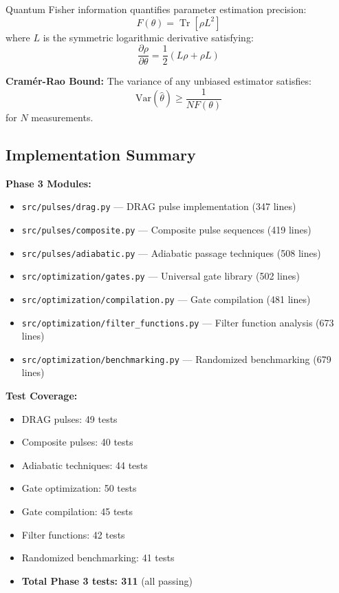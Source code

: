 \documentclass[11pt,a4paper]{article}
\theoremstyle{definition}
\theoremstyle{remark}
\renewcommand{\Tr}{\operatorname{Tr}}
\begin{document}
Quantum Fisher information quantifies parameter estimation precision:
\begin{equation}
F(\theta) = \Tr[\rho L^2]
\end{equation}
where $L$ is the symmetric logarithmic derivative satisfying:
\begin{equation}
\frac{\partial\rho}{\partial\theta} = \frac{1}{2}(L\rho + \rho L)
\end{equation}

\textbf{Cramér-Rao Bound:} The variance of any unbiased estimator satisfies:
\begin{equation}
\text{Var}(\hat{\theta}) \geq \frac{1}{NF(\theta)}
\end{equation}
for $N$ measurements.

\subsection{Implementation Summary}

\textbf{Phase 3 Modules:}
\begin{itemize}
    \item \texttt{src/pulses/drag.py} — DRAG pulse implementation (347 lines)
    \item \texttt{src/pulses/composite.py} — Composite pulse sequences (419 lines)
    \item \texttt{src/pulses/adiabatic.py} — Adiabatic passage techniques (508 lines)
    \item \texttt{src/optimization/gates.py} — Universal gate library (502 lines)
    \item \texttt{src/optimization/compilation.py} — Gate compilation (481 lines)
    \item \texttt{src/optimization/filter\_functions.py} — Filter function analysis (673 lines)
    \item \texttt{src/optimization/benchmarking.py} — Randomized benchmarking (679 lines)
\end{itemize}

\textbf{Test Coverage:}
\begin{itemize}
    \item DRAG pulses: 49 tests
    \item Composite pulses: 40 tests
    \item Adiabatic techniques: 44 tests
    \item Gate optimization: 50 tests
    \item Gate compilation: 45 tests
    \item Filter functions: 42 tests
    \item Randomized benchmarking: 41 tests
    \item \textbf{Total Phase 3 tests: 311} (all passing)
\end{itemize}
\end{document}
